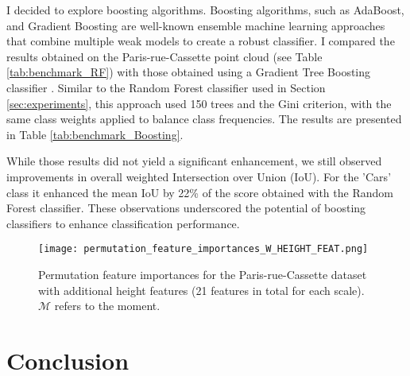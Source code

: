 \documentclass{article}
\begin{document}
I decided to explore boosting algorithms. Boosting algorithms, such as AdaBoost, and Gradient Boosting are well-known ensemble machine learning approaches that combine multiple weak models to create a robust classifier. I compared the results obtained on the Paris-rue-Cassette point cloud (see Table \ref{tab:benchmark_RF}) with those obtained using a Gradient Tree Boosting classifier \cite{ke_lightgbm_2017}. Similar to the Random Forest classifier used in Section \ref{sec:experiments}, this approach used 150 trees and the Gini criterion, with the same class weights applied to balance class frequencies. The results are presented in Table \ref{tab:benchmark_Boosting}. 

While those results did not yield a significant enhancement, we still observed improvements in overall weighted Intersection over Union (IoU). For the 'Cars' class it enhanced the mean IoU by 22\% of the score obtained with the Random Forest classifier. These observations underscored the potential of boosting classifiers to enhance classification performance.

\begin{figure}
    \hspace*{-2cm}
        \texttt{[image: permutation\_feature\_importances\_W\_HEIGHT\_FEAT.png]}
    \caption{Permutation feature importances for the Paris-rue-Cassette dataset with additional height features (21 features in total for each scale). $\mathcal{M}$ refers to the moment.}
    \label{fig:permutation_height}
\end{figure}

\section{Conclusion}
\end{document}
